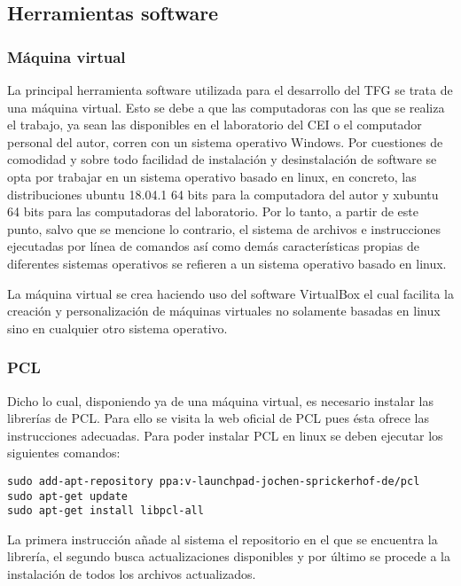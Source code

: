 \subsection{Herramientas software}
\subsubsection{Máquina virtual}
La principal herramienta software utilizada para el desarrollo del TFG se trata de una máquina virtual. Esto se debe a que las computadoras con las que se realiza el trabajo, ya sean las disponibles en el laboratorio del CEI o el computador personal del autor, corren con un sistema operativo Windows. Por cuestiones de comodidad y sobre todo facilidad de instalación y desinstalación de software se opta por trabajar en un sistema operativo basado en linux, en concreto, las distribuciones ubuntu 18.04.1 64 bits para la computadora del autor y xubuntu 64 bits para las computadoras del laboratorio. Por lo tanto, a partir de este punto, salvo que se mencione lo contrario, el sistema de archivos e instrucciones ejecutadas por línea de comandos así como demás características propias de diferentes sistemas operativos se refieren a un sistema operativo basado en linux.

La máquina virtual se crea haciendo uso del software VirtualBox el cual facilita la creación y personalización de máquinas virtuales no solamente basadas en linux sino en cualquier otro sistema operativo.


\subsubsection{PCL}
Dicho lo cual, disponiendo ya de una máquina virtual, es necesario instalar las librerías de PCL. Para ello se visita la web oficial de PCL pues ésta ofrece las instrucciones adecuadas. Para poder instalar PCL en linux se deben ejecutar los siguientes comandos:


\begin{verbatim}
sudo add-apt-repository ppa:v-launchpad-jochen-sprickerhof-de/pcl
sudo apt-get update
sudo apt-get install libpcl-all
\end{verbatim}

La primera instrucción añade al sistema el repositorio en el que se encuentra la librería, el segundo busca actualizaciones disponibles y por último se procede a la instalación de todos los archivos actualizados.

